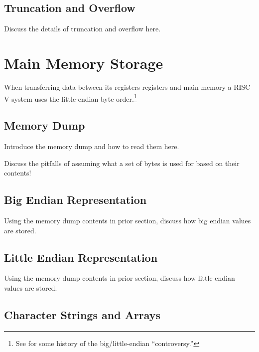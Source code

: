 \subsection{Truncation and Overflow}

Discuss the details of truncation and overflow here.





\section{Main Memory Storage}

%
When transferring data between its registers registers and main memory a
RISC-V system uses the little-endian byte order.\footnote{
See\cite{IEN137} for some history of the big/little-endian ``controversy.''}


\subsection{Memory Dump}

Introduce the memory dump and how to read them here.

Discuss the pitfalls of assuming what a set of bytes is used for based 
on their contents!

\subsection{Big Endian Representation}

Using the memory dump contents in prior section, discuss how 
big endian values are stored.

\subsection{Little Endian Representation}

Using the memory dump contents in prior section, discuss how 
little endian values are stored.

\subsection{Character Strings and Arrays}


